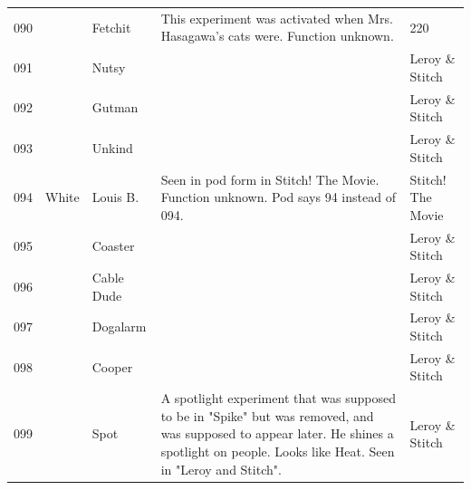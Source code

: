 \documentclass{article}
\begin{document}
\begin{tabular}{lllll}
090 &  & Fetchit & This experiment was activated when Mrs. Hasagawa's cats were. Function unknown. & 220 \\
091 &  & Nutsy &  & Leroy \& Stitch \\
092 &  & Gutman &  & Leroy \& Stitch \\
093 &  & Unkind &  & Leroy \& Stitch \\
094 & White & Louis B. & Seen in pod form in Stitch! The Movie. Function unknown. Pod says 94 instead of 094. & Stitch! The Movie \\
095 &  & Coaster &  & Leroy \& Stitch \\
096 &  & Cable Dude &  & Leroy \& Stitch \\
097 &  & Dogalarm &  & Leroy \& Stitch \\
098 &  & Cooper &  & Leroy \& Stitch \\
099 &  & Spot & A spotlight experiment that was supposed to be in "Spike" but was removed, and was supposed to appear later. He shines a spotlight on people. Looks like Heat. Seen in "Leroy and Stitch". & Leroy \& Stitch \\
\bottomrule
\end{tabular}
\end{document}
